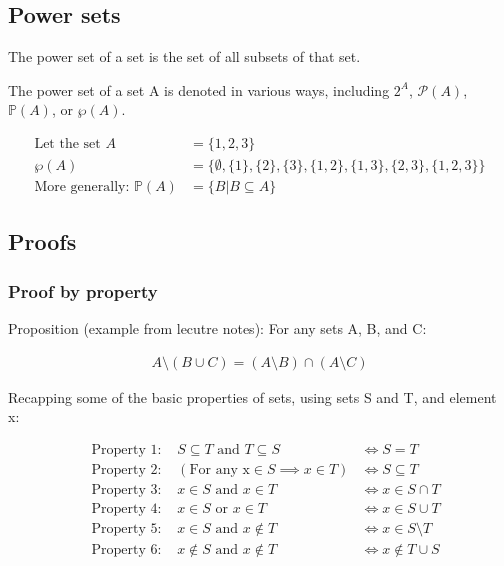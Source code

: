 \documentclass{article}
\begin{document}
\pagebreak

\subsection{Power sets}

The power set of a set is the set of all subsets of that set.

The power set of a set A is denoted in various ways, including $2^A$, $\mathcal{P}(A)$, $\mathbb{P}(A)$, or $\wp(A)$.

\begin{align*}
    \text{Let the set } A                 & = \{1, 2, 3\}                                                                   \\
    \wp(A)                                & = \{\emptyset, \{1\}, \{2\}, \{3\}, \{1, 2\}, \{1, 3\}, \{2, 3\}, \{1, 2, 3\}\} \\
    \text{More generally: } \mathbb{P}(A) & = \{B | B \subseteq A\}
\end{align*}

\subsection{Proofs}

\subsubsection{Proof by property}

Proposition (example from lecutre notes): For any sets A, B, and C:

\begin{align*}
    A\setminus (B\cup C) = (A\setminus B)\cap (A\setminus C)
\end{align*}

Recapping some of the basic properties of sets, using sets S and T, and element x:

\begin{align*}
     & \text{Property 1: } & S \subseteq T \text{ and } T \subseteq S  & \iff S = T               \\
     & \text{Property 2: } & (\text{For any x} \in S \implies x \in T) & \iff S \subseteq T       \\
     & \text{Property 3: } & x \in S \text{ and } x \in T              & \iff x \in S \cap T      \\
     & \text{Property 4: } & x \in S \text{ or } x \in T               & \iff x \in S \cup T      \\
     & \text{Property 5: } & x \in S \text{ and } x \notin T           & \iff x \in S \setminus T \\
     & \text{Property 6: } & x \notin S \text{ and } x \notin T        & \iff x \notin T \cup S   \\
\end{align*}
\end{document}
